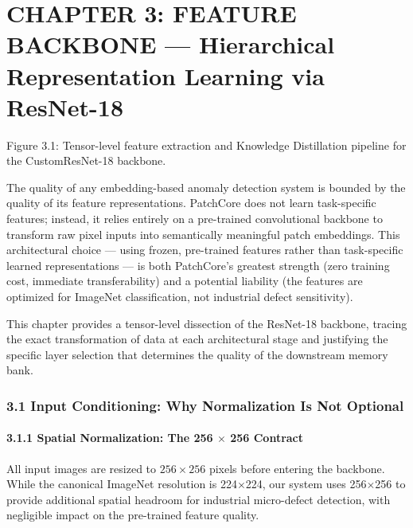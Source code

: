 \documentclass[12pt, a4paper, oneside]{report}
\begin{document}
\bigskip\noindent\hrulefill\bigskip

\chapter{CHAPTER 3: FEATURE BACKBONE --- Hierarchical Representation Learning via ResNet-18}\label{chapter-3-feature-backbone-hierarchical-representation-learning-via-resnet-18}

Figure 3.1: Tensor-level feature extraction and Knowledge Distillation pipeline for the CustomResNet-18 backbone.

The quality of any embedding-based anomaly detection system is bounded by the quality of its feature representations. PatchCore does not learn task-specific features; instead, it relies entirely on a pre-trained convolutional backbone to transform raw pixel inputs into semantically meaningful patch embeddings. This architectural choice --- using frozen, pre-trained features rather than task-specific learned representations --- is both PatchCore's greatest strength (zero training cost, immediate transferability) and a potential liability (the features are optimized for ImageNet classification, not industrial defect sensitivity).

This chapter provides a tensor-level dissection of the ResNet-18 backbone, tracing the exact transformation of data at each architectural stage and justifying the specific layer selection that determines the quality of the downstream memory bank.

\bigskip\noindent\hrulefill\bigskip

\subsection{3.1 Input Conditioning: Why Normalization Is Not Optional}\label{input-conditioning-why-normalization-is-not-optional}

\subsubsection{3.1.1 Spatial Normalization: The 256 $\times$ 256 Contract}\label{spatial-normalization-the-256-256-contract}

All input images are resized to \(256 \times 256\) pixels before entering the backbone. While the canonical ImageNet resolution is 224$\times$224, our system uses 256$\times$256 to provide additional spatial headroom for industrial micro-defect detection, with negligible impact on the pre-trained feature quality.
\end{document}
